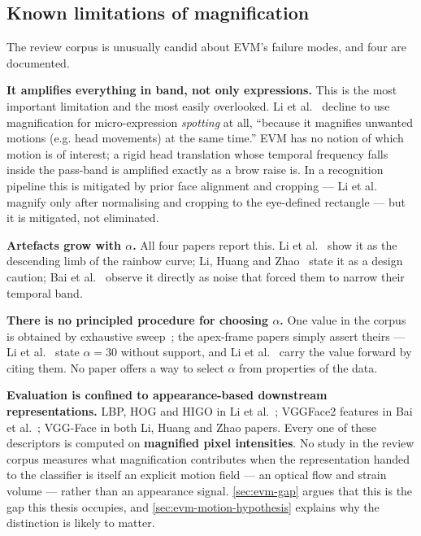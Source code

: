 \subsection{Known limitations of magnification}
\label{sec:evm-limitations}

The review corpus is unusually candid about EVM's failure modes, and four are documented.

\textbf{It amplifies everything in band, not only expressions.} This is the most important limitation and the most easily overlooked. Li et al.~\cite{liX2018} decline to use magnification for micro-expression \textit{spotting} at all, ``because it magnifies unwanted motions (e.g. head movements) at the same time.'' EVM has no notion of which motion is of interest; a rigid head translation whose temporal frequency falls inside the pass-band is amplified exactly as a brow raise is. In a recognition pipeline this is mitigated by prior face alignment and cropping --- Li et al.~\cite{liX2018} magnify only after normalising and cropping to the eye-defined rectangle --- but it is mitigated, not eliminated.

\textbf{Artefacts grow with $\alpha$.} All four papers report this. Li et al.~\cite{liX2018} show it as the descending limb of the rainbow curve; Li, Huang and Zhao~\cite{liY2018,liY2021} state it as a design caution; Bai et al.~\cite{bai2021} observe it directly as noise that forced them to narrow their temporal band.

\textbf{There is no principled procedure for choosing $\alpha$.} One value in the corpus is obtained by exhaustive sweep~\cite{liX2018}; the apex-frame papers simply assert theirs --- Li et al.~\cite{liY2018} state $\alpha = 30$ without support, and Li et al.~\cite{liY2021} carry the value forward by citing them. No paper offers a way to select $\alpha$ from properties of the data.

\textbf{Evaluation is confined to appearance-based downstream representations.} LBP, HOG and HIGO in Li et al.~\cite{liX2018}; VGGFace2 features in Bai et al.~\cite{bai2021}; VGG-Face in both Li, Huang and Zhao papers. Every one of these descriptors is computed on \textbf{magnified pixel intensities}. No study in the review corpus measures what magnification contributes when the representation handed to the classifier is itself an explicit motion field --- an optical flow and strain volume --- rather than an appearance signal. \autoref{sec:evm-gap} argues that this is the gap this thesis occupies, and \autoref{sec:evm-motion-hypothesis} explains why the distinction is likely to matter.

